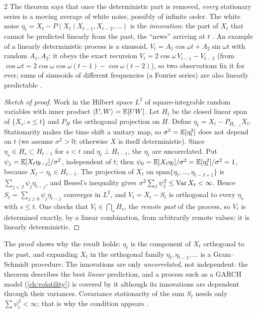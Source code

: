 \begin{paracol}{2}
The theorem says that once the deterministic part is removed, \emph{every} stationary series is a moving
average of white noise, possibly of infinite order. The white noise $\eta_t=X_t-P(X_t\mid X_{t-1},X_{t-2},\dots)$
is the \emph{innovation}: the part of $X_t$ that cannot be predicted linearly from the past, the ``news'' arriving
at $t$ . An example of a linearly deterministic process is a
sinusoid, $V_t=A_1\cos\omega t+A_2\sin\omega t$ with random $A_1,A_2$: it obeys the exact recursion
$V_t=2\cos\omega\,V_{t-1}-V_{t-2}$ (from $\cos\omega t=2\cos\omega\cos\omega(t-1)-\cos\omega(t-2)$), so two
observations fix it for ever; sums of sinusoids of different frequencies (a Fourier series) are also linearly
predictable .

\begin{proof}[Sketch of proof]
Work in the Hilbert space $L^2$ of square-integrable random variables with inner product $\langle U,W\rangle=\mathbb{E}[UW]$.
Let $H_t$ be the closed linear span of $\{X_s:s\le t\}$ and $P_{H}$ the orthogonal projection on $H$. Define
$\eta_t=X_t-P_{H_{t-1}}X_t$. Stationarity makes the time shift a unitary map, so $\sigma^2=\mathbb{E}[\eta_t^2]$ does not depend on
$t$ (we assume $\sigma^2>0$; otherwise $X$ is itself deterministic). Since $\eta_s\in H_s\subset H_{t-1}$ for $s<t$
and $\eta_t\perp H_{t-1}$, the $\eta_t$ are uncorrelated. Put $\psi_j=\mathbb{E}[X_t\eta_{t-j}]/\sigma^2$, independent of $t$; then
$\psi_0=\mathbb{E}[X_t\eta_t]/\sigma^2=\mathbb{E}[\eta_t^2]/\sigma^2=1$, because $X_t-\eta_t\in H_{t-1}$. The projection of $X_t$ on
$\mathrm{span}\{\eta_t,\dots,\eta_{t-J+1}\}$ is $\sum_{j<J}\psi_j\eta_{t-j}$, and Bessel's inequality gives
$\sigma^2\sum_j\psi_j^2\le\operatorname{Var} X_t<\infty$. Hence $S_t=\sum_{j\ge0}\psi_j\eta_{t-j}$ converges in $L^2$, and
$V_t=X_t-S_t$ is orthogonal to every $\eta_s$ with $s\le t$. One checks that $V_t\in\bigcap_sH_s$, the
\emph{remote past} of the process, so $V_t$ is determined exactly, by a linear combination, from
arbitrarily remote values: it is linearly deterministic.
\end{proof}

\begin{intuition}
The proof shows why the result holds: $\eta_t$ is the component of $X_t$ orthogonal to the past, and
expanding $X_t$ in the orthogonal family $\eta_t,\eta_{t-1},\dots$ is a Gram--Schmidt procedure. The
innovations are only \emph{uncorrelated}, not independent: the theorem describes the best \emph{linear}
prediction, and a process such as a GARCH model (\cref{ch:volatility}) is covered by it although its
innovations are dependent through their variances. Covariance stationarity of the sum
$S_t$ needs only $\sum\psi_i^2<\infty$; that is why the condition appears .
\end{intuition}


\end{paracol}
